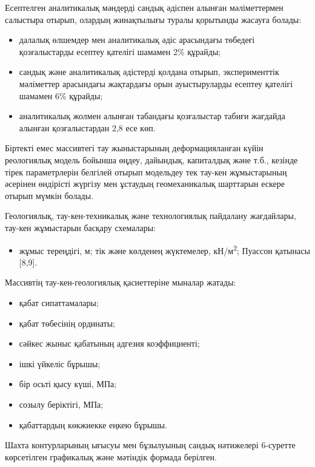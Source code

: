 Есептелген аналитикалық мәндерді сандық әдіспен алынған мәліметтермен
салыстыра отырып, олардың жинақтылығы туралы қорытынды жасауға болады:

\begin{itemize}
\item
  далалық өлшемдер мен аналитикалық әдіс арасындағы төбедеғі
  қозғалыстарды есептеу қателігі шамамен 2\% құрайды;
\item
  сандық және аналитикалық әдістерді қолдана отырып, эксперименттік
  мәліметтер арасындағы жақтардағы орын ауыстыруларды есептеу қателігі
  шамамен 6\% құрайды;
\item
  аналитикалық жолмен алынған табандағы қозғалыстар табиғи жағдайда
  алынған қозғалыстардан 2,8 есе көп.
\end{itemize}

Біртекті емес массивтегі тау жыныстарының деформацияланған күйін
реологиялық модель бойынша өңдеу, дайындық, капиталдық және т.б.,
кезінде тірек параметрлерін белгілей отырып модельдеу тек тау-кен
жұмыстарының әсерінен өндірісті жүргізу мен ұстаудың геомеханикалық
шарттарын ескере отырып мүмкін болады.

Геологиялық, тау-кен-техникалық және технологиялық пайдалану жағдайлары,
тау-кен жұмыстарын басқару схемалары:

\begin{itemize}
\item
  жұмыс тереңдігі, м; тік және көлденең жүктемелер,
  кН/м\textsuperscript{2}; Пуассон қатынасы {[}8,9{]}.
\end{itemize}

Массивтің тау-кен-геологиялық қасиеттеріне мыналар жатады:

\begin{itemize}
\item
  қабат сипаттамалары;
\item
  қабат төбесінің ординаты;
\item
  сәйкес жыныс қабатының адгезия коэффициенті;
\item
  ішкі үйкеліс бұрышы;
\item
  бір осьті қысу күші, МПа;
\item
  созылу беріктігі, МПа;
\item
  қабаттардың көкжиекке еңкею бұрышы.
\end{itemize}

Шахта контурларының ығысуы мен бұзылуының сандық нәтижелері 6-суретте
көрсетілген графикалық және мәтіндік формада берілген.

